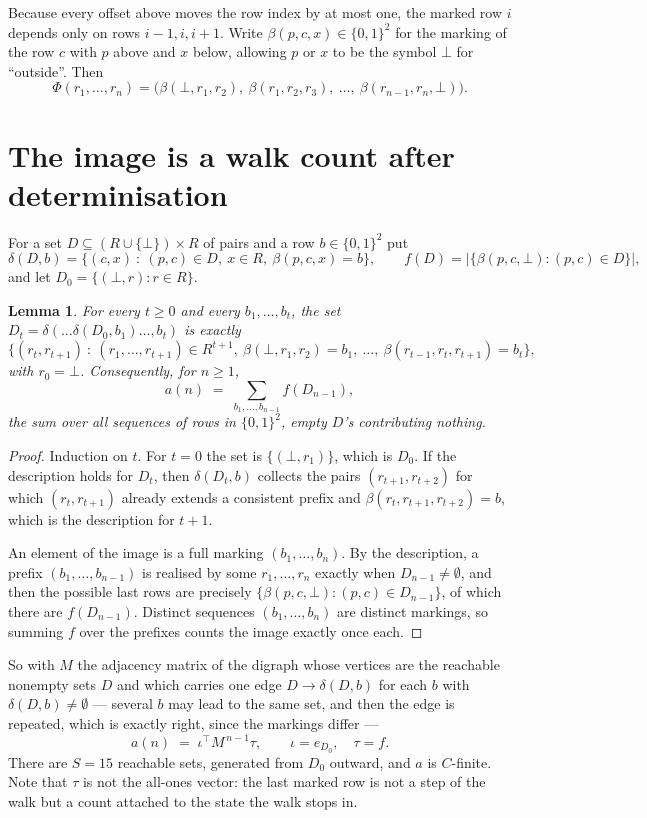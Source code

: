 \documentclass[11pt,a4paper]{article}
\theoremstyle{plain}
\newtheorem{lemma}[theorem]{Lemma}
\theoremstyle{definition}
\begin{document}
Because every offset above moves the row index by at most one, the marked row $i$ depends only
on rows $i-1,i,i+1$. Write $\beta(p,c,x)\in\{0,1\}^{2}$ for the marking of the row $c$
with $p$ above and $x$ below, allowing $p$ or $x$ to be the symbol $\bot$ for ``outside''.
Then
\[
\Phi(r_1,\dots,r_n)=\bigl(\beta(\bot,r_1,r_2),\ \beta(r_1,r_2,r_3),\ \dots,\
\beta(r_{n-1},r_n,\bot)\bigr).
\]

\section{The image is a walk count after determinisation}

For a set $D\subseteq(R\cup\{\bot\})\times R$ of pairs and a row $b\in\{0,1\}^{2}$ put
\[
\delta(D,b)=\{(c,x)\ :\ (p,c)\in D,\ x\in R,\ \beta(p,c,x)=b\},\qquad
f(D)=\bigl|\{\beta(p,c,\bot):(p,c)\in D\}\bigr| ,
\]
and let $D_0=\{(\bot,r):r\in R\}$.

\begin{lemma}\label{lem:det}
For every $t\ge0$ and every $b_1,\dots,b_t$, the set
$D_t=\delta(\dots\delta(D_0,b_1)\dots,b_t)$ is exactly
\[
\{(r_t,r_{t+1})\ :\ (r_1,\dots,r_{t+1})\in R^{t+1},\ \beta(\bot,r_1,r_2)=b_1,\ \dots,\
\beta(r_{t-1},r_t,r_{t+1})=b_t\} ,
\]
with $r_0=\bot$. Consequently, for $n\ge1$,
\[
a(n)\;=\;\sum_{b_1,\dots,b_{n-1}}f(D_{n-1}),
\]
the sum over all sequences of rows in $\{0,1\}^{2}$, empty $D$'s contributing nothing.
\end{lemma}

\begin{proof}
Induction on $t$. For $t=0$ the set is $\{(\bot,r_1)\}$, which is $D_0$. If the description
holds for $D_t$, then $\delta(D_t,b)$ collects the pairs $(r_{t+1},r_{t+2})$ for which
$(r_t,r_{t+1})$ already extends a consistent prefix and
$\beta(r_t,r_{t+1},r_{t+2})=b$, which is the description for $t+1$.

An element of the image is a full marking $(b_1,\dots,b_n)$. By the description, a prefix
$(b_1,\dots,b_{n-1})$ is realised by some $r_1,\dots,r_n$ exactly when $D_{n-1}\neq
\emptyset$, and then the possible last rows are precisely
$\{\beta(p,c,\bot):(p,c)\in D_{n-1}\}$, of which there are $f(D_{n-1})$. Distinct
sequences $(b_1,\dots,b_n)$ are distinct markings, so summing $f$ over the prefixes counts the
image exactly once each.
\end{proof}

So with $M$ the adjacency matrix of the digraph whose vertices are the reachable nonempty sets
$D$ and which carries one edge $D\to\delta(D,b)$ for each $b$ with $\delta(D,b)\neq\emptyset$
--- several $b$ may lead to the same set, and then the edge is repeated, which is exactly
right, since the markings differ ---
\[
a(n)\;=\;\iota^{\!\top}M^{\,n-1}\tau,\qquad \iota=e_{D_0},\quad \tau=f .
\]
There are $S=15$ reachable sets, generated from $D_0$ outward, and $a$ is $C$-finite. Note
that $\tau$ is not the all-ones vector: the last marked row is not a step of the walk but a
count attached to the state the walk stops in.
\end{document}
